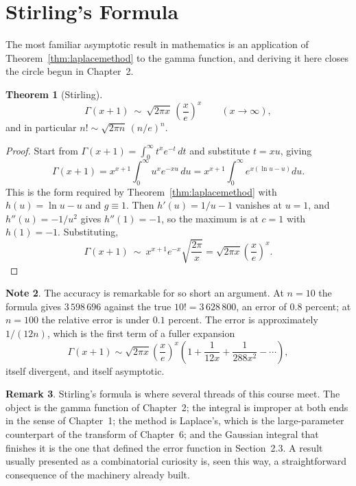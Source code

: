 \documentclass[12pt,a4paper]{report}
\theoremstyle{definition}
\newtheorem{thm}{Theorem}[section]
\newtheorem{note}[thm]{Note}
\newtheorem{remark}[thm]{Remark}
\theoremstyle{plain}
\begin{document}
\section{Stirling's Formula}

The most familiar asymptotic result in mathematics is an application of
Theorem~\ref{thm:laplacemethod} to the gamma function, and deriving it here
closes the circle begun in Chapter~2.

\begin{thm}[Stirling]
\label{thm:stirling}
$$\Gamma(x+1)\ \sim\ \sqrt{2\pi x}\,\left(\frac{x}{e}\right)^{x}
\qquad (x\to\infty),$$
and in particular $n!\sim\sqrt{2\pi n}\,(n/e)^{n}$.
\end{thm}

\begin{proof}
Start from $\Gamma(x+1)=\int^{\infty}_{0}t^{x}e^{-t}\,dt$ and substitute
$t = xu$, giving
$$\Gamma(x+1) = x^{x+1}\int^{\infty}_{0}u^{x}e^{-xu}\,du
= x^{x+1}\int^{\infty}_{0}e^{x\left(\ln u - u\right)}du .$$
This is the form required by Theorem~\ref{thm:laplacemethod} with
$h(u)=\ln u - u$ and $g\equiv1$. Then $h'(u)=1/u-1$ vanishes at $u=1$, and
$h''(u)=-1/u^{2}$ gives $h''(1)=-1$, so the maximum is at $c=1$ with
$h(1)=-1$. Substituting,
$$\Gamma(x+1)\ \sim\ x^{x+1}e^{-x}\sqrt{\frac{2\pi}{x}}
= \sqrt{2\pi x}\left(\frac{x}{e}\right)^{x}.$$
\end{proof}

\begin{note}
The accuracy is remarkable for so short an argument. At $n=10$ the formula gives
$3\,598\,696$ against the true $10! = 3\,628\,800$, an error of $0.8$ percent;
at $n=100$ the relative error is under $0.1$ percent. The error is
approximately $1/(12n)$, which is the first term of a fuller expansion
$$\Gamma(x+1)\sim\sqrt{2\pi x}\left(\frac{x}{e}\right)^{x}
\left(1+\frac{1}{12x}+\frac{1}{288x^{2}}-\cdots\right),$$
itself divergent, and itself asymptotic.
\end{note}

\begin{remark}
Stirling's formula is where several threads of this course meet. The object is
the gamma function of Chapter~2; the integral is improper at both ends in the
sense of Chapter~1; the method is Laplace's, which is the large-parameter
counterpart of the transform of Chapter~6; and the Gaussian integral that
finishes it is the one that defined the error function in Section~2.3. A result
usually presented as a combinatorial curiosity is, seen this way, a
straightforward consequence of the machinery already built.
\end{remark}
\end{document}

